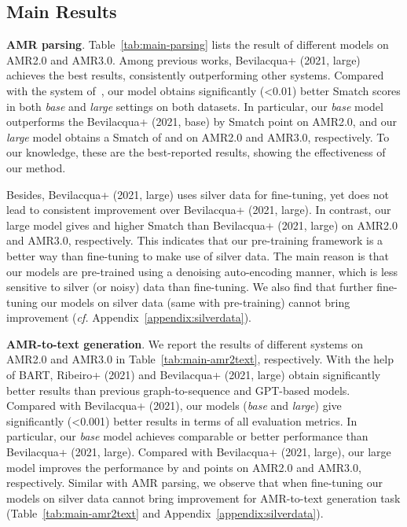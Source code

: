 \documentclass[11pt]{article}
\begin{document}
\subsection{Main Results}
\label{sec:main-res}
\noindent\textbf{AMR parsing}. Table~\ref{tab:main-parsing} lists the result of different models on AMR2.0 and AMR3.0.
Among previous works, Bevilacqua+ (2021, large) achieves the best results, consistently outperforming other systems. 
Compared with the system of~\citet{Bevilacqua_Blloshmi_Navigli_2021}, our model obtains significantly (<0.01) better Smatch scores in both \textit{base} and \textit{large} settings on both datasets.
In particular, our \textit{base} model outperforms the Bevilacqua+ (2021, base) by  Smatch point on AMR2.0, and our \textit{large} model obtains a Smatch of  and  on AMR2.0 and AMR3.0, respectively. To our knowledge, these are the best-reported results, showing the effectiveness of our method.



Besides, Bevilacqua+ (2021, large) uses silver data for fine-tuning, yet does not lead to consistent improvement over Bevilacqua+ (2021, large). 
In contrast, our large model gives  and  higher Smatch than Bevilacqua+ (2021, large) on AMR2.0 and AMR3.0, respectively.
This indicates that our pre-training framework is a better way than fine-tuning to make use of silver data.
The main reason is that our models are pre-trained using a denoising auto-encoding manner, which is less sensitive to silver (or noisy) data than fine-tuning.
We also find that further fine-tuning our models on silver data (same with pre-training) cannot bring improvement (\textit{cf.} Appendix~\ref{appendix:silverdata}).



\noindent\textbf{AMR-to-text generation}. We report the results of different systems on AMR2.0 and AMR3.0 in Table~\ref{tab:main-amr2text}, respectively. With the help of BART, Ribeiro+ (2021) and Bevilacqua+ (2021, large) obtain significantly better results than previous graph-to-sequence and GPT-based models.
Compared with Bevilacqua+ (2021), our models (\textit{base} and \textit{large}) give significantly (<0.001) better results in terms of all evaluation metrics.
In particular, our \textit{base} model achieves comparable or better performance than Bevilacqua+ (2021, large).
Compared with Bevilacqua+ (2021, large), our large model improves the performance by  and  points on AMR2.0 and AMR3.0, respectively.
Similar with AMR parsing, we  observe that when fine-tuning our models on silver data cannot bring improvement for AMR-to-text generation task (Table~\ref{tab:main-amr2text} and Appendix~\ref{appendix:silverdata}).
\end{document}
